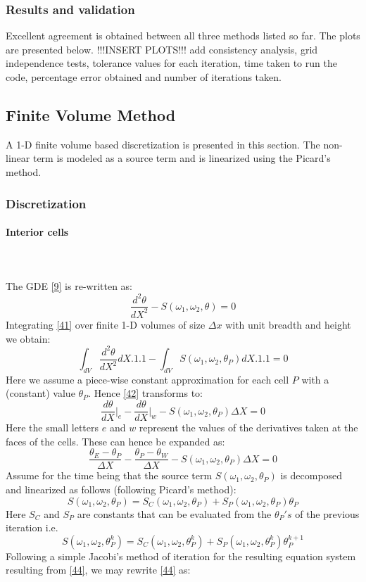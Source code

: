 \documentclass[12pt]{article}
\newcommand{\subsubsubsection}[1]{\paragraph{#1}\mbox{}\\}
\begin{document}
\subsubsection{Results and validation}
Excellent agreement is obtained between all three methods listed so far. The plots are presented below. !!!INSERT PLOTS!!! add consistency analysis, grid independence tests, tolerance values for each iteration, time taken to run the code, percentage error obtained and number of iterations taken. 
\subsection{Finite Volume Method}
A 1-D finite volume based discretization is presented in this section. The non-linear term is modeled as a source term and is linearized using the Picard's method.  
\subsubsection{Discretization}
\subsubsubsection{Interior cells}
\\The GDE \eqref{9} is re-written as: 
\[
\frac{d^2 \theta}{dX^2} - S(\omega_1, \omega_2, \theta) = 0 \tag{41} \label{41}
\]
Integrating \eqref{41} over finite 1-D volumes of size $\Delta x$ with unit breadth and height we obtain: \[
\int_{dV} \frac{d^2 \theta}{dX^2} dX.1.1 - \int_{dV} S(\omega_1, \omega_2, \theta_P) dX.1.1 = 0 \tag{42} \label{42}
\]
Here we assume a piece-wise constant approximation for each cell $P$ with a (constant) value $\theta_P$. Hence \eqref{42} transforms to: 
\[
\frac{d \theta}{dX}\Bigr|_e - \frac{d \theta}{dX}\Bigr|_w - S(\omega_1, \omega_2, \theta_P) \Delta X = 0 \tag{43} \label{43} 
\]
Here the small letters $e$ and $w$ represent the values of the derivatives taken at the faces of the cells. These can hence be expanded as: 
\[
\frac{\theta_E - \theta_P}{\Delta X} - \frac{\theta_P - \theta_W}{\Delta X} - S(\omega_1, \omega_2, \theta_P) \Delta X = 0 \tag{44} \label{44} 
\]
Assume for the time being that the source term $S(\omega_1, \omega_2, \theta_P)$ is decomposed and linearized as follows (following Picard's method): 
\[
S(\omega_1, \omega_2, \theta_P) = S_C(\omega_1, \omega_2, \theta_P) + S_P(\omega_1, \omega_2, \theta_P) \theta_P \tag{45} \label{45}
\]
Here $S_C$ and $S_P$ are constants that can be evaluated from the $\theta_P's$ of the previous iteration i.e.
\[
S(\omega_1, \omega_2, \theta_P^{k}) = S_C(\omega_1, \omega_2, \theta_P^{k}) + S_P(\omega_1, \omega_2, \theta_P^{k}) \theta_P^{k+1} \tag{46} \label{46}
\]
Following a simple Jacobi's method of iteration for the resulting equation system resulting from \eqref{44}, we may rewrite \eqref{44} as: 
\end{document}
